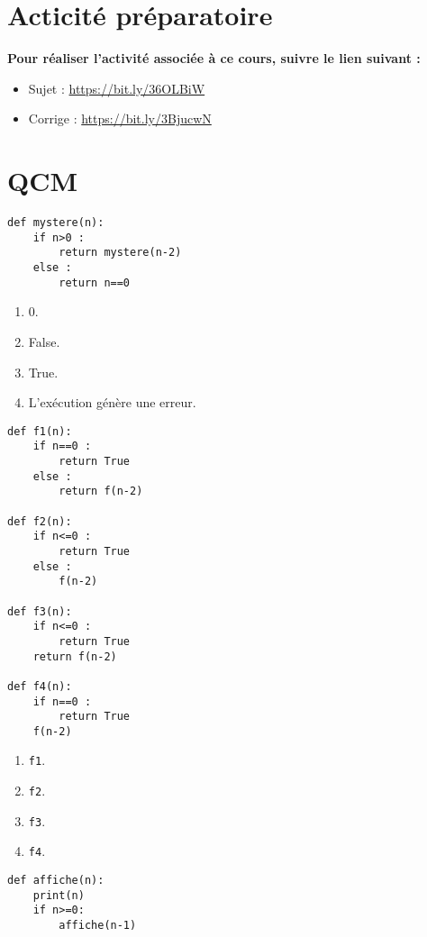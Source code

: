 \section{Acticité préparatoire}
\textbf{Pour réaliser l'activité associée à ce cours, suivre le lien suivant : }
\begin{itemize} 
\item Sujet : \url{https://bit.ly/36OLBiW}
\item Corrige : \url{https://bit.ly/3BjucwN}
\end{itemize}

\newpage
\section{QCM}

\begin{lstlisting}
def mystere(n):
    if n>0 :
        return mystere(n-2)
    else :
        return n==0
\end{lstlisting}

\begin{enumerate}
\item 0.
\item False.
\item True. %
\item L'exécution génère une erreur.
\end{enumerate}

\begin{lstlisting}
def f1(n):
    if n==0 :
        return True
    else :
        return f(n-2)
        
def f2(n):
    if n<=0 :
        return True
    else :
        f(n-2)
        
def f3(n):
    if n<=0 :
        return True
    return f(n-2)

def f4(n):
    if n==0 :
        return True
    f(n-2)
\end{lstlisting}


\begin{enumerate}
\item \texttt{f1}.
\item \texttt{f2}.
\item \texttt{f3}. %
\item \texttt{f4}.
\end{enumerate}

\begin{lstlisting}
def affiche(n):
    print(n)
    if n>=0:
        affiche(n-1)
\end{lstlisting}

